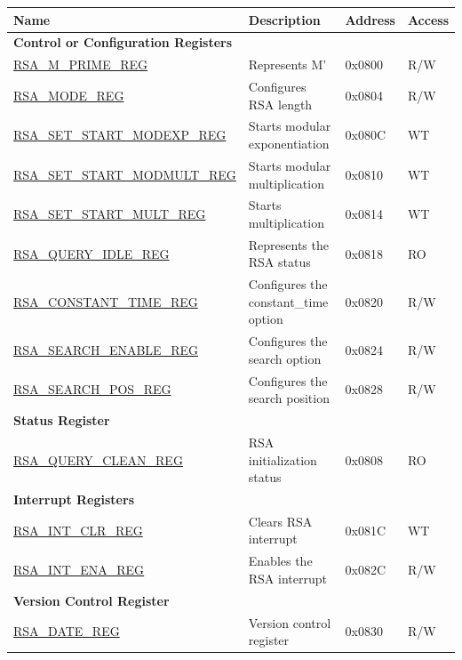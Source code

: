 \begin{longtable}{ | l | l | l | l | }
\hline\rowcolor{lightgray}
\textbf{Name} & \textbf{Description} &  \textbf{Address} & \textbf{Access} \\ \hline
\endhead
\multicolumn{4}{|l|}{\textbf{Control or Configuration Registers}} \\ \hline
\hyperref[regdesc:RSAMPRIMEREG]{RSA\_M\_PRIME\_REG} & Represents M' & 0x0800 & R/W \\ \hline
\hyperref[regdesc:RSAMODEREG]{RSA\_MODE\_REG} & Configures RSA length & 0x0804 & R/W \\ \hline
\hyperref[regdesc:RSASETSTARTMODEXPREG]{RSA\_SET\_START\_MODEXP\_REG} & Starts modular exponentiation & 0x080C & WT \\ \hline
\hyperref[regdesc:RSASETSTARTMODMULTREG]{RSA\_SET\_START\_MODMULT\_REG} & Starts modular multiplication & 0x0810 & WT \\ \hline
\hyperref[regdesc:RSASETSTARTMULTREG]{RSA\_SET\_START\_MULT\_REG} & Starts multiplication & 0x0814 & WT \\ \hline
\hyperref[regdesc:RSAQUERYIDLEREG]{RSA\_QUERY\_IDLE\_REG} & Represents the RSA status & 0x0818 & RO \\ \hline
\hyperref[regdesc:RSACONSTANTTIMEREG]{RSA\_CONSTANT\_TIME\_REG} & Configures the constant\_time option & 0x0820 & R/W \\ \hline
\hyperref[regdesc:RSASEARCHENABLEREG]{RSA\_SEARCH\_ENABLE\_REG} & Configures the search option & 0x0824 & R/W \\ \hline
\hyperref[regdesc:RSASEARCHPOSREG]{RSA\_SEARCH\_POS\_REG} & Configures the search position & 0x0828 & R/W \\ \hline
\multicolumn{4}{|l|}{\textbf{Status Register}} \\ \hline
\hyperref[regdesc:RSAQUERYCLEANREG]{RSA\_QUERY\_CLEAN\_REG} & RSA initialization status & 0x0808 & RO \\ \hline
\multicolumn{4}{|l|}{\textbf{Interrupt Registers}} \\ \hline
\hyperref[regdesc:RSAINTCLRREG]{RSA\_INT\_CLR\_REG} & Clears RSA interrupt & 0x081C & WT \\ \hline
\hyperref[regdesc:RSAINTENAREG]{RSA\_INT\_ENA\_REG} & Enables the RSA interrupt & 0x082C & R/W \\ \hline
\multicolumn{4}{|l|}{\textbf{Version Control Register}} \\ \hline
\hyperref[regdesc:RSADATEREG]{RSA\_DATE\_REG} & Version control register & 0x0830 & R/W \\ \hline
\end{longtable}
